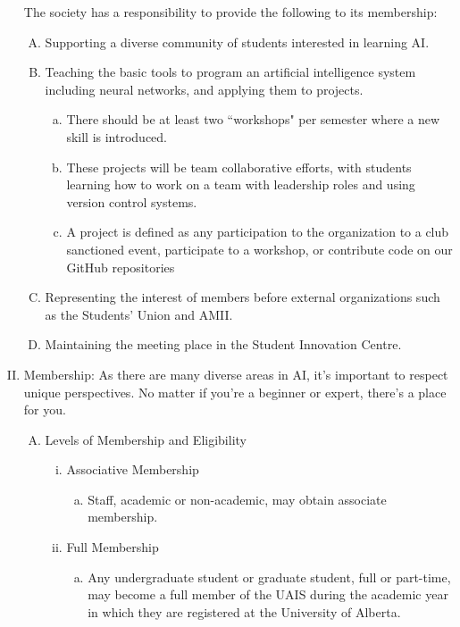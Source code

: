 \documentclass[11pt]{article}
\begin{document}
\begin{enumerate}[I.]
    The society has a responsibility to provide the following to its membership:
    \begin{enumerate}[A)]
      \item Supporting a diverse community of students interested in learning AI.
      \item Teaching the basic tools to program an artificial intelligence system including neural networks, and applying them to projects.
      \begin{enumerate}[a)]
      \item There should be at least two ``workshops" per semester where a new skill is introduced.
      \item These projects will be team collaborative efforts, with students learning how to work on a team with leadership roles and using version control systems.
      \item A project is defined as any participation to the organization to a club sanctioned event, participate to a workshop, or contribute code on our GitHub repositories
      \end{enumerate} 
      \item Representing the interest of members before external organizations such as the Students' Union and AMII.
      \item Maintaining the meeting place in the Student Innovation Centre.
    \end{enumerate}
  \item Membership: As there are many diverse areas in AI, it's important to respect unique perspectives. No matter if you're a beginner or expert, there’s a place for you.
    \begin{enumerate}[A)]
      \item Levels of Membership and Eligibility
        \begin{enumerate}[i)]
          \item Associative Membership
            \begin{enumerate}[a)]
              \item Staff, academic or non-academic, may obtain associate membership.
            \end{enumerate}
          \item Full Membership
          \begin{enumerate}[a)]
              \item Any undergraduate student or graduate student, full or part-time, may become a full member of the UAIS during the academic year in which they are registered at the University of Alberta. 

\end{enumerate}
\end{enumerate}
\end{enumerate}
\end{enumerate}
\end{document}

